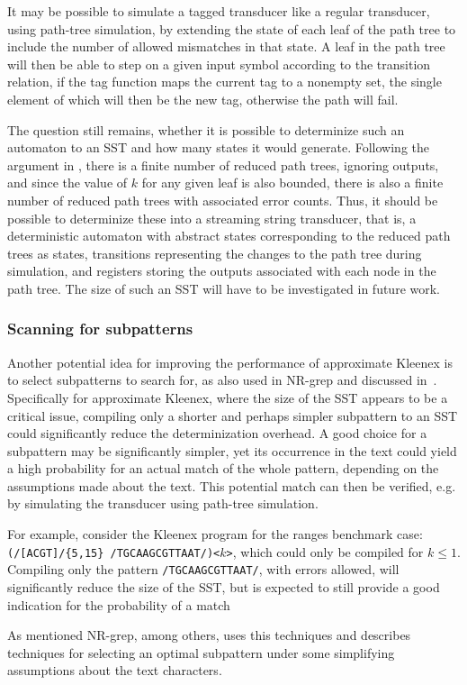 It may be possible to simulate a tagged transducer like a regular transducer,
using path-tree simulation, by extending the state of each leaf of the path
tree to include the number of allowed mismatches in that state. A leaf in the
path tree will then be able to step on a given input symbol according to the
transition relation, if the tag function maps the current tag to a nonempty
set, the single element of which will then be the new tag, otherwise the path
will fail.

The question still remains, whether it is possible to determinize such an
automaton to an SST and how many states it would generate. Following the
argument in \cite{soholm2015ordered}, there is a finite number of reduced path
trees, ignoring outputs, and since the value of $k$ for any given leaf is also
bounded, there is also a finite number of reduced path trees with associated
error counts. Thus, it should be possible to determinize these into a streaming
string transducer, that is, a deterministic automaton with abstract states
corresponding to the reduced path trees as states, transitions representing the
changes to the path tree during simulation, and registers storing the outputs
associated with each node in the path tree. The size of such an SST will have
to be investigated in future work.


\subsubsection{Scanning for subpatterns}

Another potential idea for improving the performance of approximate Kleenex is
to select subpatterns to search for, as also used in NR-grep and discussed
in~\cite{navarro2001nr}. Specifically for approximate Kleenex, where the size
of the SST appears to be a critical issue, compiling only a shorter and perhaps
simpler subpattern to an SST could significantly reduce the determinization
overhead. A good choice for a subpattern may be significantly simpler, yet its
occurrence in the text could yield a high probability for an actual match of
the whole pattern, depending on the assumptions made about the text. This
potential match can then be verified, e.g. by simulating the transducer using
path-tree simulation.

For example, consider the Kleenex program for the ranges benchmark case:
\texttt{(/[ACGT]/\{5,15\} /TGCAAGCGTTAAT/)<$k$>}, which could only be compiled
for $k\leq1$. Compiling only the pattern \texttt{/TGCAAGCGTTAAT/}, with errors
allowed, will significantly reduce the size of the SST, but is expected to
still provide a good indication for the probability of a match

As mentioned NR-grep, among others, uses this techniques and
\cite{navarro2001nr} describes techniques for selecting an optimal subpattern
under some simplifying assumptions about the text characters.

